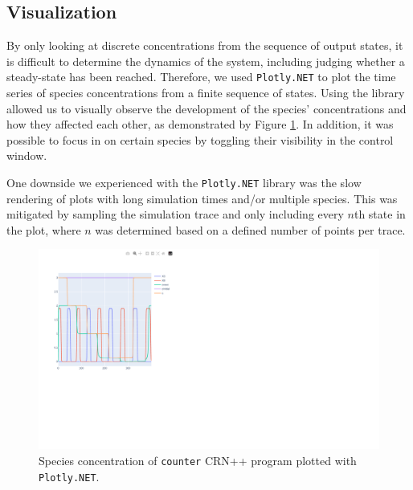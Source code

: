 \subsection{Visualization} %
By only looking at discrete concentrations from the sequence of output states, it is difficult to determine the dynamics of the system, including judging whether a steady-state has been reached. Therefore, we used \texttt{Plotly.NET} \cite{plotly} to plot the time series of species concentrations from a finite sequence of states. Using the library allowed us to visually observe the development of the species' concentrations and how they affected each other, as demonstrated by Figure \ref{fig:counter-plot}. In addition, it was possible to focus in on certain species by toggling their visibility in the control window. 

One downside we experienced with the \texttt{Plotly.NET} library was the slow rendering of plots with long simulation times and/or multiple species. This was mitigated by sampling the simulation trace and only including every $n$th state in the plot, where $n$ was determined based on a defined number of points per trace.

\begin{figure}[h]
    \centering
    \hspace{3em}\includegraphics[width=.7\textwidth]{Figures/counter-plot.pdf}
    \caption{Species concentration of \texttt{counter} CRN++ program plotted with \texttt{Plotly.NET}.}
    \label{fig:counter-plot}
\end{figure}
